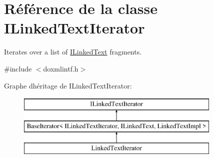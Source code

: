 \hypertarget{class_i_linked_text_iterator}{}\section{Référence de la classe I\+Linked\+Text\+Iterator}
\label{class_i_linked_text_iterator}


Iterates over a list of \hyperlink{class_i_linked_text}{I\+Linked\+Text} fragments.  




{\ttfamily \#include $<$doxmlintf.\+h$>$}

Graphe d\textquotesingle{}héritage de I\+Linked\+Text\+Iterator\+:\begin{figure}[H]
\begin{center}
\leavevmode
\includegraphics[height=3.000000cm]{class_i_linked_text_iterator}
\end{center}
\end{figure}
